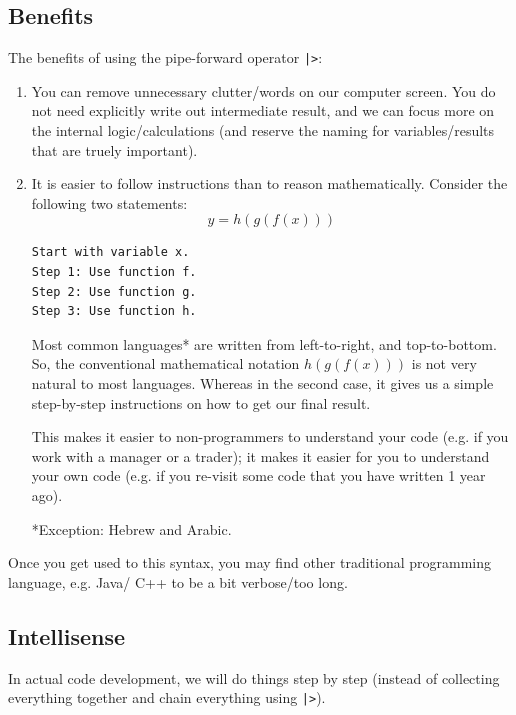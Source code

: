 \documentclass[12pt]{article}
\begin{document}
\subsection{Benefits}
The benefits of using the pipe-forward operator \texttt{|>}:
\begin{enumerate}
\item You can remove unnecessary clutter/words on our computer screen. You do not need explicitly write out intermediate result, and we can focus more on the internal logic/calculations (and reserve the naming for variables/results that are truely important).

\item It is easier to follow instructions than to reason mathematically. Consider the following two statements:
\[
 y = h\left(g \left(f \left(x \right)\right)\right)
\]
\begin{lstlisting}
Start with variable x.
Step 1: Use function f.
Step 2: Use function g.
Step 3: Use function h.
\end{lstlisting}
Most common languages* are written from left-to-right, and top-to-bottom. So, the conventional mathematical notation $h\left(g \left(f \left(x \right)\right)\right)$ is not very natural to most languages. Whereas in the second case, it gives us a simple step-by-step instructions on how to get our final result. 

This makes it easier to non-programmers to understand your code (e.g. if you work with a manager or a trader); it makes it easier for you to understand your own code (e.g. if you re-visit some code that you have written 1 year ago). 

*Exception: Hebrew and Arabic.

\end{enumerate}
Once you get used to this syntax, you may find other traditional programming language, e.g. Java/ C++ to be a bit verbose/too long.

\pagebreak

\subsection{Intellisense}
In actual code development, we will do things step by step (instead of collecting everything together and chain everything using \texttt{|>}). 
\end{document}

